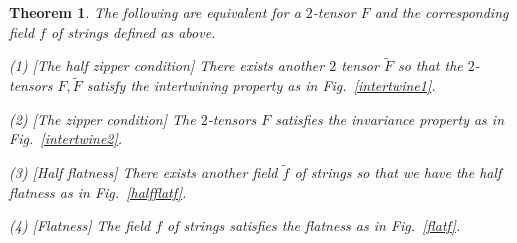 \documentclass[10pt,a4paper]{amsart}
\newtheorem{theorem}{Theorem}
\begin{document}
\begin{theorem}\label{zipper}
The following are equivalent for a $2$-tensor $F$ and 
the corresponding field $f$ of strings defined as above.

\textnormal{(1) [The half zipper condition]}
There exists another $2$ tensor $\tilde F$ so that
the $2$-tensors $F, \tilde F$ satisfy the intertwining property 
as in Fig.~\ref{intertwine1}.

\textnormal{(2) [The zipper condition]}
The $2$-tensors $F$ satisfies the invariance property 
as in Fig.~\ref{intertwine2}.

\textnormal{(3) [Half flatness]}
There exists another field $\tilde f$ of strings so that we have
the half flatness as in Fig.~\ref{halfflatf}.

\textnormal{(4) [Flatness]}
The field $f$ of strings satisfies
the flatness as in Fig.~\ref{flatf}.
\end{theorem}
\end{document}
